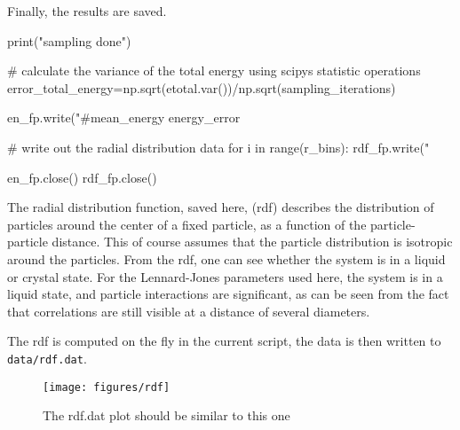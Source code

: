 \documentclass[
paper=a4,                       %
fontsize=11pt,                  %
twoside,                        %
footsepline,                    %
headsepline,                    %
headinclude=false,              %
footinclude=false,              %
pagesize,                       %
]{scrartcl}
\newtheorem{task}{Task}
\begin{document}
Finally, the results are saved.
\begin{pypresso}
print("\nMain sampling done\n")

# calculate the variance of the total energy using scipys statistic operations
error_total_energy=np.sqrt(etotal.var())/np.sqrt(sampling_iterations)

en_fp.write("#mean_energy energy_error %

# write out the radial distribution data
for i in range(r_bins):
    rdf_fp.write("%


en_fp.close()
rdf_fp.close()
\end{pypresso}
The radial distribution function, saved here, (rdf) describes the distribution of particles around
the center of a fixed particle, as a function of the particle-particle distance. This of course assumes
that the particle distribution is isotropic around the particles.
From the rdf, one can see whether the system is in a liquid or crystal state.
For the Lennard-Jones parameters used here, the system is in a liquid state, and particle interactions are significant, as can be seen from the fact that correlations are still visible at a distance of several diameters.

The rdf is computed on the fly in the current script, the data is then written to
\texttt{data/rdf.dat}.


\begin{figure}[ht]
\begin{center}
\texttt{[image: figures/rdf]}
\label{fig:rdf}
\caption{The rdf.dat plot should be similar to this one}
\end{center}
\end{figure}



\vspace{1cm}\vspace{1cm}
\end{document}
